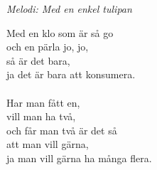 {\footnotesize\textit{Melodi: Med en enkel tulipan}}\par
\vspace{10pt}
Med en klo som är så go\\
och en pärla jo, jo,\\
så är det bara,\\
ja det är bara att konsumera.\\
\\
Har man fått en,\\
vill man ha två,\\
och får man två är det så\\
att man vill gärna,\\
ja man vill gärna ha många flera.
